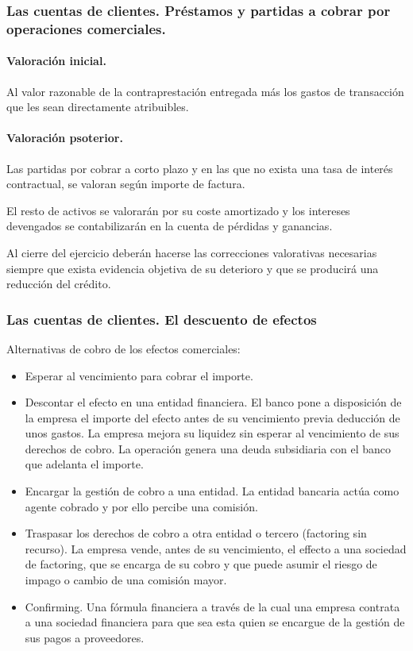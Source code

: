 \subsubsection{Las cuentas de clientes. Préstamos y partidas a cobrar por operaciones comerciales.}
\paragraph{Valoración inicial.} Al valor razonable de la contraprestación entregada más los gastos de transacción que les sean directamente atribuibles.

\paragraph{Valoración psoterior.} Las partidas por cobrar a corto plazo y en las que no exista una tasa de interés contractual, se valoran según importe de factura. 

El resto de activos se valorarán por su coste amortizado y los intereses devengados se contabilizarán en la cuenta de pérdidas y ganancias.

Al cierre del ejercicio deberán hacerse las correcciones valorativas necesarias siempre que exista evidencia objetiva de su deterioro y que se producirá una reducción del crédito.

\subsubsection{Las cuentas de clientes. El descuento de efectos}
Alternativas de cobro de los efectos comerciales:
\begin{itemize}
    \item Esperar al vencimiento para cobrar el importe.
    \item Descontar el efecto en una entidad financiera. El banco pone a disposición de la empresa el importe del efecto antes de su vencimiento previa deducción de unos gastos. La empresa mejora su liquidez sin esperar al vencimiento de sus derechos de cobro. La operación genera una deuda subsidiaria con el banco que adelanta el importe.
    \item Encargar la gestión de cobro a una entidad. La entidad bancaria actúa como agente cobrado y por ello percibe una comisión.
    \item Traspasar los derechos de cobro a otra entidad o tercero (factoring sin recurso). La empresa vende, antes de su vencimiento, el effecto a una sociedad de factoring, que se encarga de su cobro y que puede asumir el riesgo de impago o cambio de una comisión mayor.
    \item Confirming. Una fórmula financiera a través de la cual una empresa contrata a una sociedad financiera para que sea esta quien se encargue de la gestión de sus pagos a proveedores.
\end{itemize}

